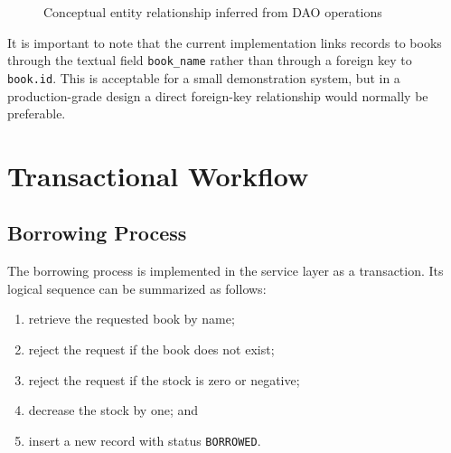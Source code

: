 \documentclass[12pt,a4paper]{report}
\begin{document}
\begin{figure}[H]
    \centering
    \caption{Conceptual entity relationship inferred from DAO operations}
\end{figure}

It is important to note that the current implementation links records to books through the textual field \texttt{book\_name} rather than through a foreign key to \texttt{book.id}. This is acceptable for a small demonstration system, but in a production-grade design a direct foreign-key relationship would normally be preferable.

\chapter{Transactional Workflow}

\section{Borrowing Process}
The borrowing process is implemented in the service layer as a transaction. Its logical sequence can be summarized as follows:
\begin{enumerate}
    \item retrieve the requested book by name;
    \item reject the request if the book does not exist;
    \item reject the request if the stock is zero or negative;
    \item decrease the stock by one; and
    \item insert a new record with status \texttt{BORROWED}.
\end{enumerate}
\end{document}
